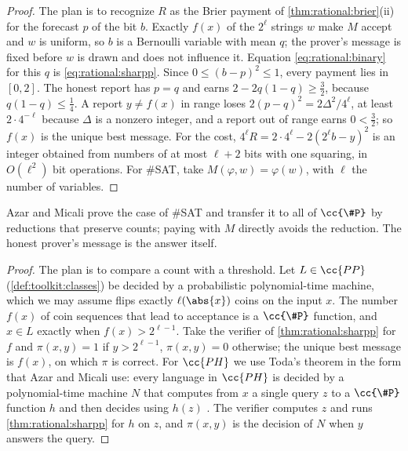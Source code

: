 \begin{refsection}
\begin{proof}
The plan is to recognize $R$ as the Brier payment of \cref{thm:rational:brier}(ii) for the forecast $p$ of the bit $b$. Exactly $f(x)$ of the $2^\ell$ strings $w$ make $M$ accept and $w$ is uniform, so $b$ is a Bernoulli variable with mean $q$; the prover's message is fixed before $w$ is drawn and does not influence it. Equation \eqref{eq:rational:binary} for this $q$ is \eqref{eq:rational:sharpp}. Since $0\le(b-p)^2\le1$, every payment lies in $[0,2]$. The honest report has $p=q$ and earns $2-2q(1-q)\ge\frac32$, because $q(1-q)\le\frac14$. A report $y\ne f(x)$ in range loses $2(p-q)^2=2\Delta^2/4^\ell$, at least $2\cdot4^{-\ell}$ because $\Delta$ is a nonzero integer, and a report out of range earns $0<\frac32$; so $f(x)$ is the unique best message. For the cost, $4^\ell R=2\cdot4^\ell-2(2^\ell b-y)^2$ is an integer obtained from numbers of at most $\ell+2$ bits with one squaring, in $O(\ell^2)$ bit operations. For \#SAT, take $M(\varphi,w)=\varphi(w)$, with $\ell$ the number of variables.
\end{proof}

Azar and Micali prove the case of \#SAT and transfer it to all of $\cc{\#P}$ by reductions that preserve counts; paying with $M$ directly avoids the reduction. The honest prover's message is the answer itself.


\begin{proof}
The plan is to compare a count with a threshold. Let $L\in\cc{PP}$ (\cref{def:toolkit:classes}) be decided by a probabilistic polynomial-time machine, which we may assume flips exactly $\ell(\abs{x})$ coins on the input $x$. The number $f(x)$ of coin sequences that lead to acceptance is a $\cc{\#P}$ function, and $x\in L$ exactly when $f(x)>2^{\ell-1}$. Take the verifier of \cref{thm:rational:sharpp} for $f$ and $\pi(x,y)=1$ if $y>2^{\ell-1}$, $\pi(x,y)=0$ otherwise; the unique best message is $f(x)$, on which $\pi$ is correct. For $\cc{PH}$ we use Toda's theorem in the form that Azar and Micali use: every language in $\cc{PH}$ is decided by a polynomial-time machine $N$ that computes from $x$ a single query $z$ to a $\cc{\#P}$ function $h$ and then decides using $h(z)$ \parencite{Toda1991}. The verifier computes $z$ and runs \cref{thm:rational:sharpp} for $h$ on $z$, and $\pi(x,y)$ is the decision of $N$ when $y$ answers the query.
\end{proof}


\end{refsection}
